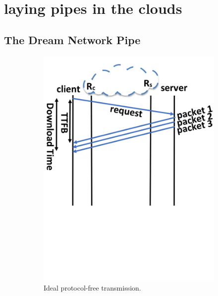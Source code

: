 \section{laying pipes in the clouds}\label{sec:rate-control}

\subsection{The Dream Network Pipe}\label{subsec:dream-pipe}

\begin{figure}[!t]
  \centering
    \begin{subfigure}{0.65\columnwidth}
  \centering
  \includegraphics[width=\columnwidth]{figures/ideal.png}
    \caption{Ideal protocol-free transmission.}
    \label{fig:ideal}
\end{subfigure}    \centering
\begin{subfigure}{0.65\columnwidth}
  \centering

\end{subfigure}
\end{figure}
